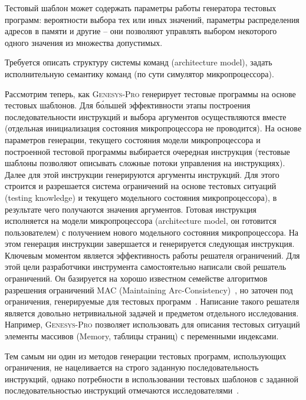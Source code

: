 Тестовый шаблон может содержать параметры работы генератора тестовых
программ: вероятности выбора тех или иных значений, параметры
распределения адресов в памяти и другие -- они позволяют управлять
выбором некоторого одного значения из множества допустимых.

Требуется описать структуру системы команд (architecture model),
задать исполнительную семантику команд (по сути симулятор
микропроцессора).

Рассмотрим теперь, как \textsc{Genesys-Pro} генерирует тестовые
программы на основе тестовых шаблонов. Для б\'{о}льшей эффективности
этапы построения последовательности инструкций и выбора аргументов
осуществляются вместе (отдельная инициализация состояния
микропроцессора не проводится). На основе параметров генерации,
текущего состояния модели микропроцессора и построенной тестовой
программы выбирается очередная инструкция (тестовые шаблоны
позволяют описывать сложные потоки управления на инструкциях). Далее
для этой инструкции генерируются аргументы инструкций. Для этого
строится и разрешается система ограничений на основе тестовых
ситуаций (testing knowledge) и текущего модельного состояния
микропроцессора), в результате чего получаются значения аргументов.
Готовая инструкция исполняется на модели микропроцессора
(architecture model, он готовится пользователем) с получением нового
модельного состояния микропроцессора. На этом генерация инструкции
завершается и генерируется следующая инструкция. Ключевым моментом
является эффективность работы решателя ограничений. Для этой цели
разработчики инструмента самостоятельно написали свой решатель
ограничений. Он базируется на хорошо известном семействе алгоритмов
разрешения ограничений MAC (Maintaining Arc-Consistency)~\cite{CSP},
но заточен под ограничения, генерируемые для тестовых
программ~\cite{GenesysSolver}. Написание такого решателя является
довольно нетривиальной задачей и предметом отдельного исследования.
Например, \textsc{Genesys-Pro} позволяет использовать для описания
тестовых ситуаций элементы массивов (Memory, таблицы страниц) с
переменными индексами.

Тем самым ни один из методов генерации тестовых программ,
использующих ограничения, не нацеливается на строго заданную
последовательность инструкций, однако потребности в использовании
тестовых шаблонов с заданной последовательностью инструкций
отмечаются исследователями~\cite{kamkin}.


